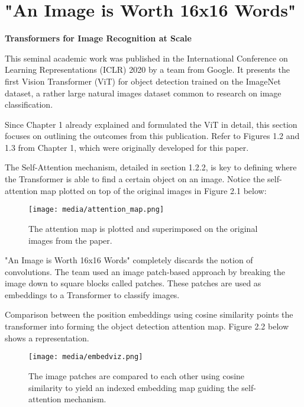 \section{"An Image is Worth 16x16 Words"}

\textbf{Transformers for Image Recognition at Scale}


This seminal academic work was published in the International Conference on 
Learning Representations (ICLR) 2020 by a team from Google.
It presents the first Vision Transformer (ViT) for object detection
trained on the ImageNet dataset, a rather large natural images dataset common to research on 
image classification.


Since Chapter 1 already explained and formulated the ViT in detail, this section focuses
on outlining the outcomes from this publication. Refer to Figures 1.2 and 1.3 from Chapter 1, which
were originally developed for this paper.


The Self-Attention mechanism, detailed in section 1.2.2, is key to defining where the Transformer is able to 
find a certain object on an image. Notice the self-attention map plotted on top of the original images in 
Figure 2.1 below:

\begin{figure}[H]
	\begin{center}
	\texttt{[image: media/attention\_map.png]}
	\end{center}
	\caption[Attention Map Plot]{The attention map is plotted and superimposed on the 
	original images from the paper. \citep{dosovitskiy2020vit}}
\end{figure}


"An Image is Worth 16x16 Words" completely discards the notion of convolutions. 
The team used an image patch-based approach by breaking the image down to square blocks called patches.
These patches are used as embeddings to a Transformer to classify images.

Comparison between the position embeddings using cosine similarity points the transformer into
forming the object detection attention map. Figure 2.2 below shows a representation.


\begin{figure}[H]
	\begin{center}
	\texttt{[image: media/embedviz.png]}
	\end{center}
	\caption[Cosine Similarity of Image Patches]{The image patches are compared to each other using cosine similarity
	 to yield an indexed embedding map guiding the self-attention mechanism. \citep{dosovitskiy2020vit}}
\end{figure}

